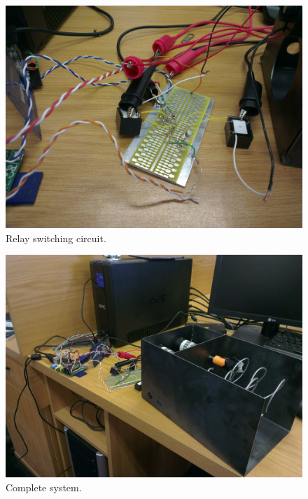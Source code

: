 \begin{figure}
 \centering 
 \includegraphics[clip=true, trim = 1000 100 400 500,
 scale=0.15]{switch}
 \caption{Relay switching circuit.}
\end{figure}

\begin{figure}
 \centering 
 \includegraphics[clip=true, trim = 200 0 0 400,
 scale=0.15]{everything}
 \caption{Complete system.}
\end{figure}